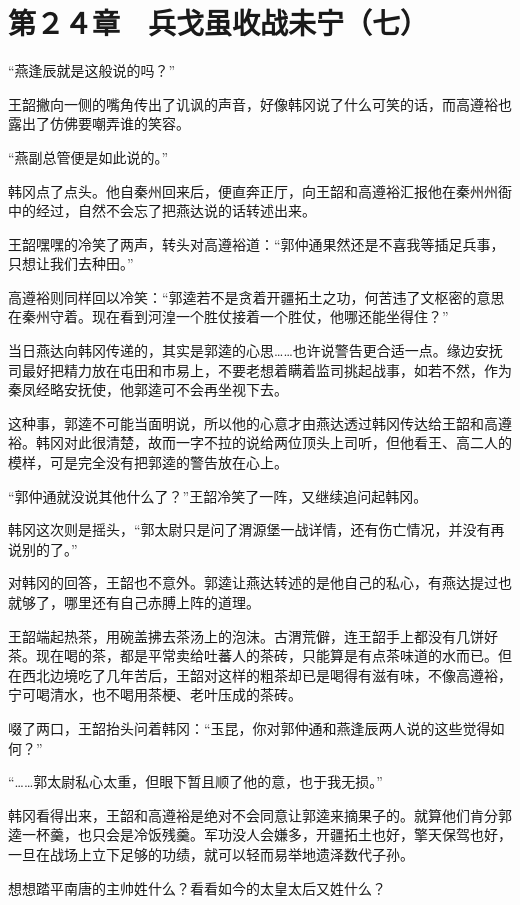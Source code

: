 \section{第２４章　兵戈虽收战未宁（七）}

“燕逢辰就是这般说的吗？”

王韶撇向一侧的嘴角传出了讥讽的声音，好像韩冈说了什么可笑的话，而高遵裕也露出了仿佛要嘲弄谁的笑容。

“燕副总管便是如此说的。”

韩冈点了点头。他自秦州回来后，便直奔正厅，向王韶和高遵裕汇报他在秦州州衙中的经过，自然不会忘了把燕达说的话转述出来。

王韶嘿嘿的冷笑了两声，转头对高遵裕道：“郭仲通果然还是不喜我等插足兵事，只想让我们去种田。”

高遵裕则同样回以冷笑：“郭逵若不是贪着开疆拓土之功，何苦违了文枢密的意思在秦州守着。现在看到河湟一个胜仗接着一个胜仗，他哪还能坐得住？”

当日燕达向韩冈传递的，其实是郭逵的心思……也许说警告更合适一点。缘边安抚司最好把精力放在屯田和市易上，不要老想着瞒着监司挑起战事，如若不然，作为秦凤经略安抚使，他郭逵可不会再坐视下去。

这种事，郭逵不可能当面明说，所以他的心意才由燕达透过韩冈传达给王韶和高遵裕。韩冈对此很清楚，故而一字不拉的说给两位顶头上司听，但他看王、高二人的模样，可是完全没有把郭逵的警告放在心上。

“郭仲通就没说其他什么了？”王韶冷笑了一阵，又继续追问起韩冈。

韩冈这次则是摇头，“郭太尉只是问了渭源堡一战详情，还有伤亡情况，并没有再说别的了。”

对韩冈的回答，王韶也不意外。郭逵让燕达转述的是他自己的私心，有燕达提过也就够了，哪里还有自己赤膊上阵的道理。

王韶端起热茶，用碗盖拂去茶汤上的泡沫。古渭荒僻，连王韶手上都没有几饼好茶。现在喝的茶，都是平常卖给吐蕃人的茶砖，只能算是有点茶味道的水而已。但在西北边境吃了几年苦后，王韶对这样的粗茶却已是喝得有滋有味，不像高遵裕，宁可喝清水，也不喝用茶梗、老叶压成的茶砖。

啜了两口，王韶抬头问着韩冈：“玉昆，你对郭仲通和燕逢辰两人说的这些觉得如何？”

“……郭太尉私心太重，但眼下暂且顺了他的意，也于我无损。”

韩冈看得出来，王韶和高遵裕是绝对不会同意让郭逵来摘果子的。就算他们肯分郭逵一杯羹，也只会是冷饭残羹。军功没人会嫌多，开疆拓土也好，擎天保驾也好，一旦在战场上立下足够的功绩，就可以轻而易举地遗泽数代子孙。

想想踏平南唐的主帅姓什么？看看如今的太皇太后又姓什么？

